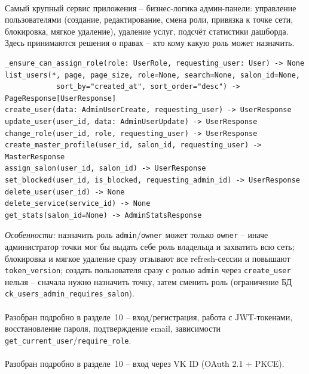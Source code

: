 \paragraph{}
Самый крупный сервис приложения -- бизнес-логика админ-панели: управление
пользователями (создание, редактирование, смена роли, привязка к точке
сети, блокировка, мягкое удаление), удаление услуг, подсчёт статистики
дашборда. Здесь принимаются решения о правах -- кто кому какую роль
может назначить.
\begin{verbatim}
_ensure_can_assign_role(role: UserRole, requesting_user: User) -> None
list_users(*, page, page_size, role=None, search=None, salon_id=None,
            sort_by="created_at", sort_order="desc") -> PageResponse[UserResponse]
create_user(data: AdminUserCreate, requesting_user) -> UserResponse
update_user(user_id, data: AdminUserUpdate) -> UserResponse
change_role(user_id, role, requesting_user) -> UserResponse
create_master_profile(user_id, salon_id, requesting_user) -> MasterResponse
assign_salon(user_id, salon_id) -> UserResponse
set_blocked(user_id, is_blocked, requesting_admin_id) -> UserResponse
delete_user(user_id) -> None
delete_service(service_id) -> None
get_stats(salon_id=None) -> AdminStatsResponse
\end{verbatim}
\textit{Особенности:} назначить роль \texttt{admin}/\texttt{owner} может
только \texttt{owner} -- иначе администратор точки мог бы выдать себе
роль владельца и захватить всю сеть; блокировка и мягкое удаление сразу
отзывают все refresh-сессии и повышают \texttt{token_version}; создать
пользователя сразу с ролью \texttt{admin} через \texttt{create_user}
нельзя -- сначала нужно назначить точку, затем сменить роль (ограничение
БД \texttt{ck_users_admin_requires_salon}).

\paragraph{}
Разобран подробно в разделе~10 -- вход/регистрация, работа с
JWT-токенами, восстановление пароля, подтверждение email, зависимости
\texttt{get_current_user}/\texttt{require_role}.

\paragraph{}
Разобран подробно в разделе~10 -- вход через VK ID (OAuth 2.1 + PKCE).

